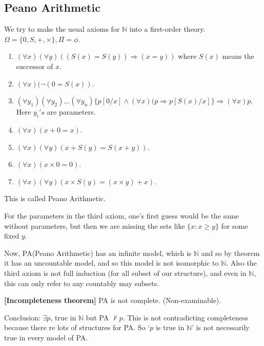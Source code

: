 \subsection{Peano Arithmetic}
We try to make the usual axioms for $\mathbb{N}$ into a first-order theory. $\Omega=\{0,S,+,\times\}, \Pi=\phi$.
\begin{enumerate}
\item $(\forall x)(\forall y)((S(x)=S(y)) \Rightarrow (x=y))$ where $S(x)$ means the successor of $x$.\\
\item $(\forall x)(\neg (0=S(x))$.\\
\item $(\forall y_1)(\forall y_2)\ldots (\forall y_n)\{p[0/x] \wedge (\forall x)(p \Rightarrow p[S(x)/x]\} \Rightarrow (\forall x)p$. Here $y_i's$ are parameters.\\
\item $(\forall x)(x+0=x)$.\\
\item $(\forall x)(\forall y)(x+S(y)=S(x+y))$.\\
\item $(\forall x)(x \times 0 =0)$.\\
\item $(\forall x)(\forall y)(x \times S(y) = (x \times y)+x)$.
\end{enumerate}
This is called Peano Arithmetic.
\begin{remark} For the parameters in the third axiom, one's first guess would be the same without parameters, but then we are missing the sets like $\{x: x \ge y\}$ for some fixed $y$.
\end{remark}
Now, PA(Peano Arithmetic) has an infinite model, which is $\mathbb{N}$ and so by theorem it has an uncountable model, and so this model is not isomorphic to $\mathbb{N}$. Also the third axiom is not full induction (for all subset of our structure), and even in $\mathbb{N}$, this can only refer to any countably may subsets.\\
\begin{theorem}{\bf [Incompleteness theorem]} PA is not complete. (Non-examinable).
\end{theorem}
Conclusion: $\exists p$, true in $\mathbb{N}$ but PA $\not \vdash p$. This is not contradicting completeness because there re lots of structures for PA. So `$p$ is true in $\mathbb{N}$' is not necessarily true in every model of PA.
